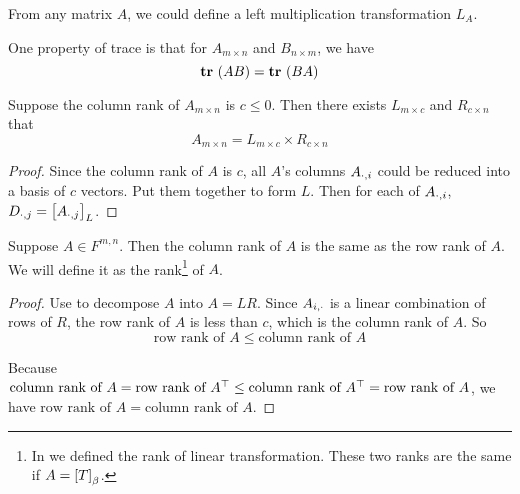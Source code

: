 From any matrix $A$, we could define a left multiplication transformation $L_A$.


\begin{example}
    One property of trace is that for $A_{m \times n}$ and $B_{n \times m}$, we have
\begin{equation}
    \displaystyle \mathop{\bf tr\/}~( AB ) = \displaystyle \mathop{\bf tr\/}~( BA )
\end{equation}
\end{example}


\begin{theorem}\label{column-row-factorization}
    Suppose the column rank of $A_{m \times n}$ is $c \leq 0$. Then there exists $L_{m \times c}$ and $R_{c \times n}$ that
    \begin{equation}
        A_{m \times n} = L_{m \times c} \times R_{c \times n}
    \end{equation}
\end{theorem}
\begin{proof}
    Since the column rank of $A$ is $c$, all $A$'s columns ${A}_{\cdot, {i}}$ could be reduced into a basis of $c$ vectors. Put them together to form $L$. Then for each of ${A}_{\cdot, {i}}$, $\selectmatrixcolumn{D}{j} = \coordinate{\selectmatrixcolumn{A}{j}}_L$.
\end{proof}

\begin{theorem}\label{rank-of-matrix}
    Suppose $A \in F^{m,n}$. Then the column rank of $A$ is the same as the row rank of $A$. We will define it as the rank\footnote{In  we defined the rank of linear transformation. These two ranks are the same if $A=\coordinate{T}_\beta$.} of $A$.
\end{theorem}
\begin{proof}
    Use  to decompose $A$ into $A = LR$. Since ${A}_{{i},\cdot}$ is a linear combination of rows of $R$, the row rank of $A$ is less than $c$, which is the column rank of $A$. So
    \begin{equation*}
        \text{row rank of } A \leq \text{column rank of } A
    \end{equation*}
    
    Because $\text{column rank of } A = \text{row rank of } {A}^\top \leq \text{column rank of } {A}^\top = \text{row rank of } A$, we have $\text{row rank of } A = \text{column rank of } A$.
\end{proof}



